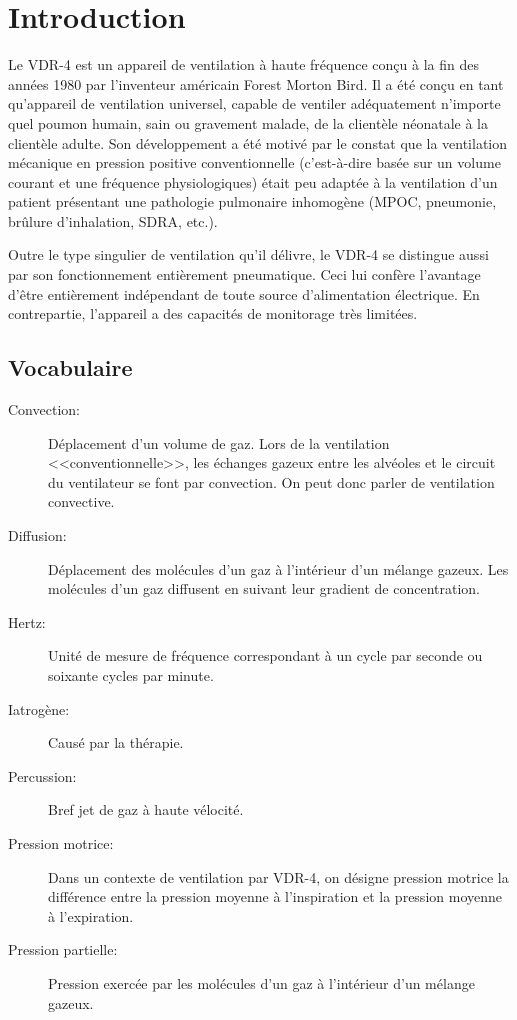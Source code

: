 \chapter{Introduction}

Le VDR-4 est un appareil de ventilation à haute fréquence conçu à la fin des années 1980 par l'inventeur américain Forest Morton Bird. 
Il a été conçu en tant qu'appareil de ventilation universel, capable de ventiler adéquatement n’importe quel poumon humain, sain ou gravement malade, de la clientèle néonatale à la clientèle adulte. 
Son développement a été motivé par le constat que la ventilation mécanique en pression positive conventionnelle (c’est-à-dire basée sur un volume courant et une fréquence physiologiques) était peu adaptée à la ventilation d'un patient présentant une pathologie pulmonaire inhomogène (MPOC, pneumonie, brûlure d’inhalation, SDRA, etc.).

Outre le type singulier de ventilation qu’il délivre, le VDR-4 se distingue aussi par son fonctionnement entièrement pneumatique. Ceci lui confère l'avantage d’être entièrement indépendant de toute source d'alimentation électrique. En contrepartie, l'appareil a des capacités de monitorage très limitées.

\section{Vocabulaire}

\begin{description}
	\item[Convection:] Déplacement d’un volume de gaz. Lors de la ventilation <<conventionnelle>>, les échanges gazeux entre les alvéoles et le circuit du ventilateur se font par convection. On peut donc parler de ventilation convective.
	\item [Diffusion:] Déplacement des molécules d’un gaz à l’intérieur d’un mélange gazeux. Les molécules d’un gaz diffusent en suivant leur gradient de concentration.
	\item [Hertz:] Unité de mesure de fréquence correspondant à un cycle par seconde ou soixante cycles par minute.
	\item [Iatrogène:] Causé par la thérapie.
	\item [Percussion:] Bref jet de gaz à haute vélocité.
	\item [Pression motrice:] Dans un contexte de ventilation par VDR-4, on désigne pression motrice la différence entre la pression moyenne à l’inspiration et la pression moyenne à l’expiration.
	\item [Pression partielle:] Pression exercée par les molécules d’un gaz à l’intérieur d’un mélange gazeux.
\end{description}

